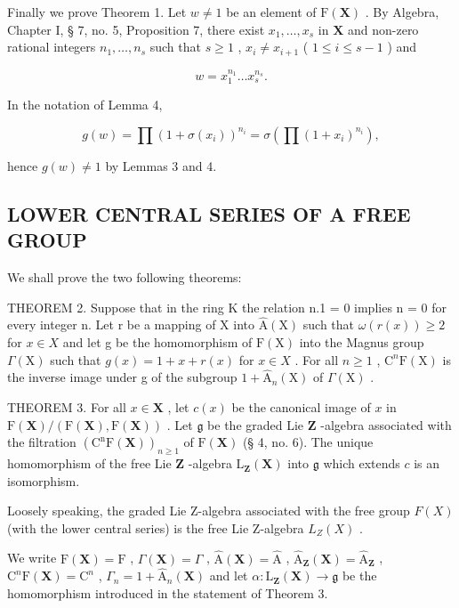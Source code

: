 Finally we prove Theorem 1. Let \(w \neq 1\) be an element of \(\mathrm{F}(\mathbf{X})\) . By Algebra, Chapter I, § 7, no. 5, Proposition 7, there exist \(x_{1}, \ldots, x_{s}\) in \(\mathbf{X}\) and non-zero rational integers \(n_{1}, \ldots, n_{s}\) such that \(s \geqslant 1\) , \(x_{i} \neq x_{i+1}\) ( \(1 \leqslant i \leqslant s - 1\) ) and

\[
w = x _ {1} ^ {n _ {1}} \dots x _ {s} ^ {n _ {s}}.
\]

In the notation of Lemma 4,

\[
g (w) = \prod (1 + \sigma (x _ {i})) ^ {n _ {i}} = \sigma (\prod (1 + x _ {i}) ^ {n _ {i}}),
\]

hence \(g(w) \neq 1\) by Lemmas 3 and 4.

\subsection{LOWER CENTRAL SERIES OF A FREE GROUP}

We shall prove the two following theorems:

THEOREM 2. Suppose that in the ring K the relation n.1 = 0 implies n = 0 for every integer n. Let r be a mapping of X into \(\hat{\mathrm{A}}(\mathrm{X})\) such that \(\omega(r(x)) \geqslant 2\) for \(x \in X\) and let g be the homomorphism of \(\mathrm{F}(\mathrm{X})\) into the Magnus group \(\Gamma(\mathrm{X})\) such that \(g(x) = 1 + x + r(x)\) for \(x \in X\) . For all \(n \geqslant 1\) , \(\mathrm{C}^n\mathrm{F}(\mathrm{X})\) is the inverse image under g of the subgroup \(1 + \hat{\mathrm{A}}_n(\mathrm{X})\) of \(\Gamma(\mathrm{X})\) .

THEOREM 3. For all \(x \in \mathbf{X}\) , let \(c(x)\) be the canonical image of \(x\) in \(\mathrm{F}(\mathbf{X}) / (\mathrm{F}(\mathbf{X}), \mathrm{F}(\mathbf{X}))\) . Let \(\mathfrak{g}\) be the graded Lie \(\mathbf{Z}\) -algebra associated with the filtration \((\mathrm{C}^{\mathrm{n}}\mathrm{F}(\mathbf{X}))_{n \geqslant 1}\) of \(\mathrm{F}(\mathbf{X})\) (§ 4, no. 6). The unique homomorphism of the free Lie \(\mathbf{Z}\) -algebra \(\mathrm{L}_{\mathbf{Z}}(\mathbf{X})\) into \(\mathfrak{g}\) which extends \(c\) is an isomorphism.

Loosely speaking, the graded Lie Z-algebra associated with the free group \(F(X)\) (with the lower central series) is the free Lie Z-algebra \(L_{Z}(X)\) .

We write \(\mathrm{F}(\mathbf{X}) = \mathrm{F}\) , \(\Gamma(\mathbf{X}) = \Gamma\) , \(\hat{\mathrm{A}}(\mathbf{X}) = \hat{\mathrm{A}}\) , \(\hat{\mathrm{A}}_{\mathbf{Z}}(\mathbf{X}) = \hat{\mathrm{A}}_{\mathbf{Z}}\) , \(\mathrm{C}^n\mathrm{F}(\mathbf{X}) = \mathrm{C}^n\) , \(\Gamma_n = 1 + \hat{\mathrm{A}}_n(\mathbf{X})\) and let \(\alpha: \mathrm{L}_{\mathbf{Z}}(\mathbf{X}) \to \mathfrak{g}\) be the homomorphism introduced in the statement of Theorem 3.

